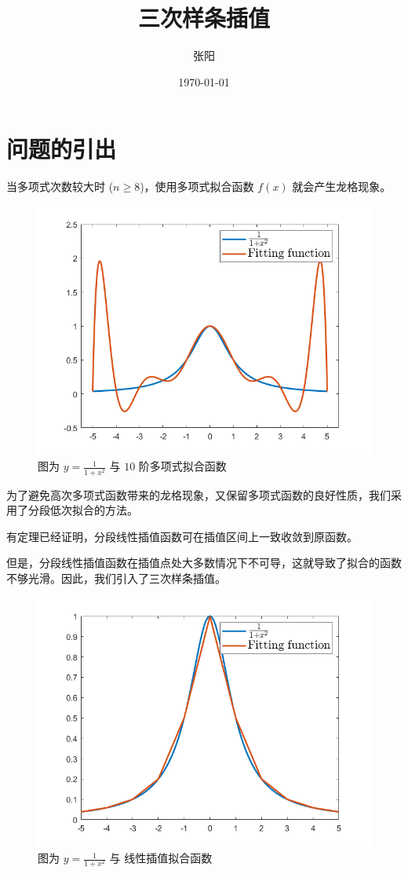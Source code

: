 \documentclass{ctexart}
\author{张阳}
\date{\today}
\title{三次样条插值}
\numberwithin{equation}{section}
\begin{document}
\maketitle
\tableofcontents
\newpage
\section{问题的引出}
当多项式次数较大时 ($n\geqslant8$)，使用多项式拟合函数 $f(x)$ 就会产生龙格现象。
\begin{figure}[htp]
    \centering
    \includegraphics[width=0.7\linewidth]{fig/龙格现象}
    \caption{图为 $y=\frac{1}{1+x^2}$ 与 $10$ 阶多项式拟合函数}
    \label{fig:1}
\end{figure}

为了避免高次多项式函数带来的龙格现象，又保留多项式函数的良好性质，我们采用了分段低次拟合的方法。

有定理已经证明，分段线性插值函数可在插值区间上一致收敛到原函数。

但是，分段线性插值函数在插值点处大多数情况下不可导，这就导致了拟合的函数不够光滑。因此，我们引入了三次样条插值。
\begin{figure}[htp]
    \centering
    \includegraphics[width=0.7\linewidth]{fig/分段线性插值}
    \caption{图为 $y=\frac{1}{1+x^2}$ 与 线性插值拟合函数}
    \label{fig:2}
\end{figure}
\end{document}
